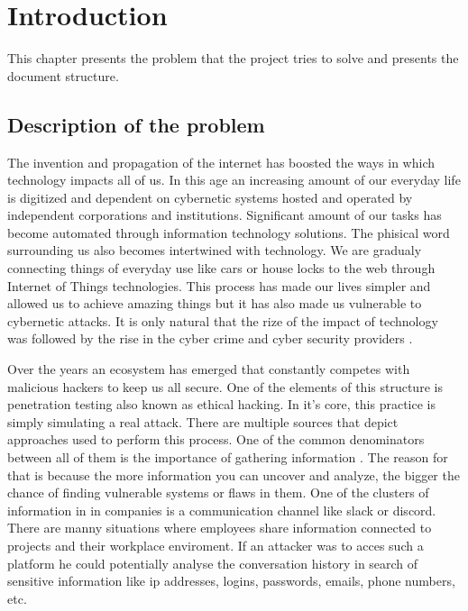\documentclass[a4paper,twoside,12pt]{book}
\newcounter{PagesWithoutNumbers}
\begin{document}
\vfill
 
 

\cleardoublepage


\pagestyle{onlyPageNumbers}
\tableofcontents

\setcounter{PagesWithoutNumbers}{\value{page}}
\mainmatter
\pagestyle{PageNumbersChapterTitles}



\chapter{Introduction}

This chapter presents the problem that the project tries to solve and presents the document structure.

\section{Description of the problem}

The invention and propagation of the internet has boosted the ways in which technology impacts
all of us. In this age an increasing amount of our everyday life is digitized and dependent 
on cybernetic systems hosted and operated by independent corporations and institutions. Significant
amount of our tasks has become automated through information technology solutions. The phisical word 
surrounding us also becomes intertwined with technology. We are gradualy connecting things of everyday 
use like cars or house locks to the web through Internet of Things technologies. This process has 
made our lives simpler and allowed us to achieve amazing things but it has also made us vulnerable to 
cybernetic attacks. It is only natural that the rize of the impact of technology was followed 
by the rise in the cyber crime and cyber security providers \cite{bib:articleImportanceOfCybersecurity}. 

Over the years an ecosystem has emerged that constantly competes with malicious hackers to keep us all secure.
One of the elements of this structure is penetration testing also known as ethical hacking. In it's core, 
this practice is simply simulating a real attack. There are multiple sources that depict approaches 
used to perform this process. One of the common denominators between all of them is the importance of 
gathering information \cite{bib:bookEthicalHacking}. The reason for that is because the more information you can uncover and analyze, 
the bigger the chance of finding vulnerable systems or flaws in them. One of the clusters of information 
in in companies is a communication channel like slack or discord. There are manny situations where employees 
share information connected to projects and their workplace enviroment. If an attacker was to acces such a 
platform he could potentially analyse the conversation history in search of sensitive information like ip addresses, 
logins, passwords, emails, phone numbers, etc.
\end{document}
